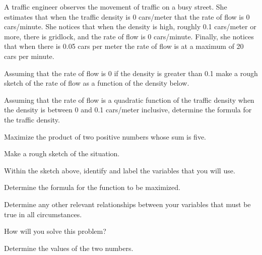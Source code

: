 \begin{problem}

\item A traffic engineer observes the movement of traffic on a busy
  street. She estimates that when the traffic density is 0 cars/meter
  that the rate of flow is 0 cars/minute. She notices that when the
  density is high, roughly 0.1 cars/meter or more, there is gridlock,
  and the rate of flow is 0 cars/minute. Finally, she notices that
  when there is 0.05 cars per meter the rate of flow is at a maximum
  of 20 cars per minute.
  \begin{subproblem}
  \item Assuming that the rate of flow is 0 if the density is greater
    than 0.1 make a rough sketch of the rate of flow as a function of
    the density below.
    \vfill
  \item Assuming that the rate of flow is a quadratic function of the
    traffic density when the density is between 0 and 0.1 cars/meter
    inclusive, determine the formula for the traffic density.
    \vfill
  \end{subproblem}

  \clearpage

\item Maximize the product of two positive numbers whose sum is five.
\begin{subproblem}
  \item Make a rough sketch of the situation.
    \vfill
  \item Within the sketch above, identify and label the variables
    that you will use.
  \item Determine the formula for the function to be maximized.
    \vfill
  \item Determine any other relevant relationships between your
    variables that must be true in all circumstances.  
    \vfill
  \item How will you solve this problem?
    \vfill
  \item Determine the values of the two numbers.
    \vfill
    \vfill
\end{subproblem}


\end{problem}

